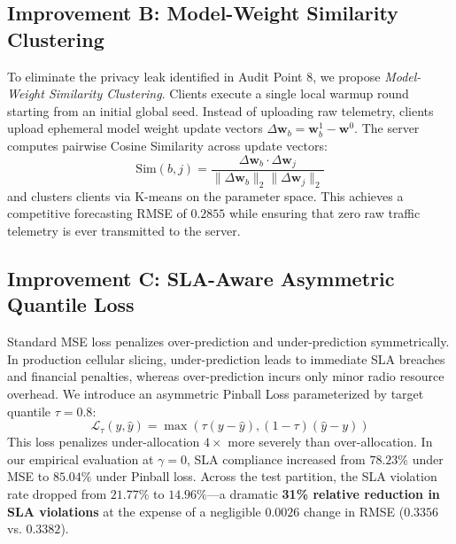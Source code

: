 \documentclass[10pt,journal,compsoc,twocolumn]{article}
\begin{document}
\subsection{Improvement B: Model-Weight Similarity Clustering}
To eliminate the privacy leak identified in Audit Point 8, we propose \textit{Model-Weight Similarity Clustering}. Clients execute a single local warmup round starting from an initial global seed. Instead of uploading raw telemetry, clients upload ephemeral model weight update vectors $\Delta \mathbf{w}_b = \mathbf{w}_b^1 - \mathbf{w}^0$. The server computes pairwise Cosine Similarity across update vectors:
\begin{equation}
    \text{Sim}(b, j) = \frac{\Delta \mathbf{w}_b \cdot \Delta \mathbf{w}_j}{\|\Delta \mathbf{w}_b\|_2 \|\Delta \mathbf{w}_j\|_2}
\end{equation}
and clusters clients via K-means on the parameter space. This achieves a competitive forecasting RMSE of $0.2855$ while ensuring that zero raw traffic telemetry is ever transmitted to the server.

\subsection{Improvement C: SLA-Aware Asymmetric Quantile Loss}
Standard MSE loss penalizes over-prediction and under-prediction symmetrically. In production cellular slicing, under-prediction leads to immediate SLA breaches and financial penalties, whereas over-prediction incurs only minor radio resource overhead. We introduce an asymmetric Pinball Loss parameterized by target quantile $\tau = 0.8$:
\begin{equation}
    \mathcal{L}_{\tau}(y, \hat{y}) = \max\left( \tau (y - \hat{y}), (1 - \tau)(\hat{y} - y) \right)
\end{equation}
This loss penalizes under-allocation $4\times$ more severely than over-allocation. In our empirical evaluation at $\gamma=0$, SLA compliance increased from $78.23\%$ under MSE to $85.04\%$ under Pinball loss. Across the test partition, the SLA violation rate dropped from $21.77\%$ to $14.96\%$—a dramatic \textbf{31\% relative reduction in SLA violations} at the expense of a negligible $0.0026$ change in RMSE ($0.3356$ vs. $0.3382$).
\end{document}
